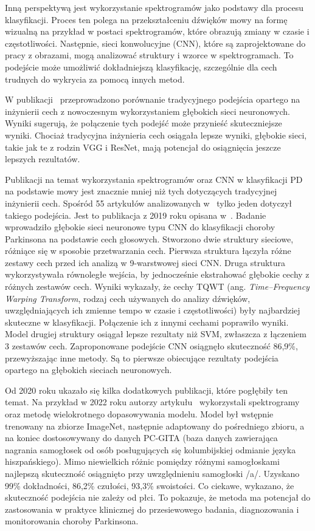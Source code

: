 Inną perspektywą jest wykorzystanie spektrogramów jako podstawy dla procesu klasyfikacji.
Proces ten polega na przekształceniu dźwięków mowy na formę wizualną na przykład w postaci spektrogramów, które obrazują zmiany w czasie i częstotliwości.
Następnie, sieci konwolucyjne (CNN), które są zaprojektowane do pracy z obrazami, mogą analizować struktury i wzorce w spektrogramach.
To podejście może umożliwić dokładniejszą klasyfikację, szczególnie dla cech trudnych do wykrycia za pomocą innych metod.

W publikacji~\cite{Majda-Zdancewicz_Potulska-Chromik_Jakubowski_Nojszewska_Kostera-Pruszczyk} przeprowadzono porównanie tradycyjnego podejścia
opartego na inżynierii cech z nowoczesnym wykorzystaniem głębokich sieci neuronowych.
Wyniki sugerują, że połączenie tych podejść może przynieść skuteczniejsze wyniki.
Chociaż tradycyjna inżynieria cech osiągała lepsze wyniki, głębokie sieci, takie jak te z rodzin VGG i ResNet, mają potencjał do osiągnięcia jeszcze
lepszych rezultatów.

Publikacji na temat wykorzystania spektrogramów oraz CNN w klasyfikacji PD na podstawie mowy jest znacznie mniej niż tych dotyczących tradycyjnej inżynierii cech.
Spośród 55 artykułów analizowanych w~\cite{ML_for_PD_review} tylko jeden dotyczył takiego podejścia.
Jest to publikacja z 2019 roku opisana w~\cite{Gunduz}.
Badanie wprowadziło głębokie sieci neuronowe typu CNN do klasyfikacji choroby Parkinsona na podstawie cech głosowych.
Stworzono dwie struktury sieciowe, różniące się w sposobie przetwarzania cech.
Pierwsza struktura łączyła różne zestawy cech przed ich analizą w 9-warstwowej sieci CNN. Druga struktura wykorzystywała
równoległe wejścia, by jednocześnie ekstrahować głębokie cechy z różnych zestawów cech.
Wyniki wykazały, że cechy TQWT (ang. \emph{Time–Frequency Warping Transform}, rodzaj cech używanych do analizy dźwięków,
uwzględniających ich zmienne tempo w czasie i częstotliwości) były najbardziej skuteczne w klasyfikacji.
Połączenie ich z innymi cechami poprawiło wyniki.
Model drugiej struktury osiągał lepsze rezultaty niż SVM, zwłaszcza z łączeniem 3 zestawów cech.
Zaproponowane podejście CNN osiągnęło skuteczność 86,9\%, przewyższając inne metody.
Są to pierwsze obiecujące rezultaty podejścia opartego na głębokich sieciach neuronowych.

Od 2020 roku ukazało się kilka dodatkowych publikacji, które pogłębiły ten temat.
Na przykład w 2022 roku autorzy artykułu~\cite{HIRES2022105021} wykorzystali spektrogramy oraz metodę wielokrotnego dopasowywania modelu.
Model był wstępnie trenowany na zbiorze ImageNet, następnie adaptowany do pośredniego zbioru, a na koniec dostosowywany do danych PC-GITA (baza danych zawierająca nagrania samogłosek od
osób posługujących się kolumbijskiej odmianie języka hiszpańskiego).
Mimo niewielkich różnic pomiędzy różnymi samogłoskami najlepszą skuteczność osiągnięto przy uwzględnieniu samogłoski /a/.
Uzyskano 99\% dokładności, 86,2\% czułości, 93,3\% swoistości.
Co ciekawe, wykazano, że skuteczność podejścia nie zależy od płci.
To pokazuje, że metoda ma potencjał do zastosowania w praktyce klinicznej do przesiewowego badania, diagnozowania i monitorowania choroby Parkinsona.

